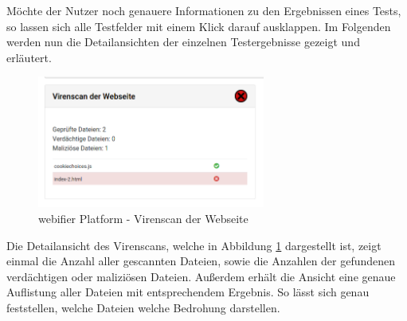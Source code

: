 Möchte der Nutzer noch genauere Informationen zu den Ergebnissen eines Tests, so lassen sich alle Testfelder mit einem Klick darauf ausklappen. Im Folgenden werden nun die Detailansichten der einzelnen Testergebnisse gezeigt und erläutert.

\begin{figure}[H]
  \centering
  \includegraphics[width=7.5cm]{images/platform/virusscan-malicious}
  \caption{webifier Platform - Virenscan der Webseite}
  \label{fig:platform-result-virusscan}
\end{figure}

Die Detailansicht des Virenscans, welche in Abbildung \ref{fig:platform-result-virusscan} dargestellt ist, zeigt einmal die Anzahl aller gescannten Dateien, sowie die Anzahlen der gefundenen verdächtigen oder maliziösen Dateien. Außerdem erhält die Ansicht eine genaue Auflistung aller Dateien mit entsprechendem Ergebnis. So lässt sich genau feststellen, welche Dateien welche Bedrohung darstellen.

